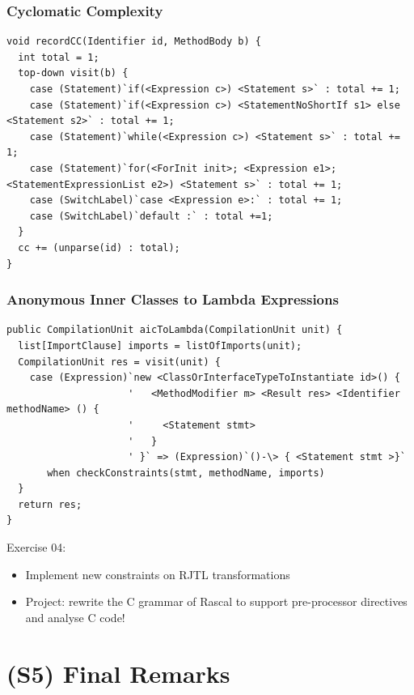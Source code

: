 \documentclass{beamer}
\begin{document}
\begin{frame}[fragile]
  \frametitle{Cyclomatic Complexity}

  \begin{lstlisting}[language=Rascal]
void recordCC(Identifier id, MethodBody b) { 
  int total = 1;
  top-down visit(b) {
    case (Statement)`if(<Expression c>) <Statement s>` : total += 1; 
    case (Statement)`if(<Expression c>) <StatementNoShortIf s1> else <Statement s2>` : total += 1; 
    case (Statement)`while(<Expression c>) <Statement s>` : total += 1; 
    case (Statement)`for(<ForInit init>; <Expression e1>; <StatementExpressionList e2>) <Statement s>` : total += 1;
    case (SwitchLabel)`case <Expression e>:` : total += 1; 
    case (SwitchLabel)`default :` : total +=1;  
  }
  cc += (unparse(id) : total); 
}
  \end{lstlisting}
\end{frame}

\begin{frame}[fragile]
  \frametitle{Anonymous Inner Classes to Lambda Expressions}

  \begin{lstlisting}[language=Rascal]
public CompilationUnit aicToLambda(CompilationUnit unit) {
  list[ImportClause] imports = listOfImports(unit);
  CompilationUnit res = visit(unit) {
    case (Expression)`new <ClassOrInterfaceTypeToInstantiate id>() {
                     '   <MethodModifier m> <Result res> <Identifier methodName> () {
                     '     <Statement stmt>
                     '   }
                     ' }` => (Expression)`()-\> { <Statement stmt >}` 
       when checkConstraints(stmt, methodName, imports)   
  }
  return res;
}
\end{lstlisting}
\end{frame}

\begin{frame}
  \begin{block}{Exercise 04:}
    \begin{itemize}
      \item Implement new constraints on RJTL transformations
      \item Project: rewrite the C grammar of Rascal to support pre-processor directives \pause
        and analyse C code!
    \end{itemize}  
  \end{block}  
\end{frame}

\section{(S5) Final Remarks}
\end{document}

